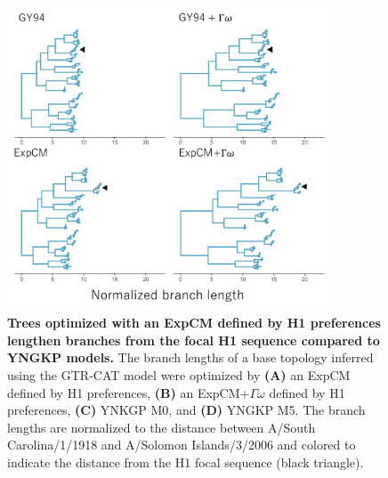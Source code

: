 \documentclass[11pt]{article}
\begin{document}
\begin{figure}[H]
\centerline{\includegraphics[width=0.85\textwidth]{figures/tree_doud}}
\caption{\label{fig:tree_doud}
\textbf{Trees optimized with an ExpCM defined by H1 preferences lengthen branches from the focal H1 sequence compared to YNGKP models.} 
The branch lengths of a base topology inferred using the GTR-CAT model were optimized by \textbf{(A)} an ExpCM defined by H1 preferences, \textbf{(B)} an ExpCM+$\Gamma\omega$ defined by H1 preferences, \textbf{(C)} YNKGP M0, and \textbf{(D)} YNGKP M5.
The branch lengths are normalized to the distance between A/South Carolina/1/1918 and A/Solomon Islands/3/2006 and colored to indicate the distance from the H1 focal sequence (black triangle).
}
\end{figure}
\end{document}
